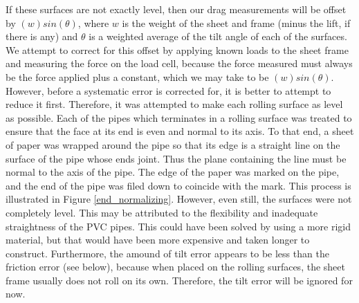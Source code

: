 \documentclass[12pt]{report} %
\begin{document}
If these surfaces are not exactly level, then our drag measurements will be offset by $(w)sin(\theta)$,
where $w$ is the weight of the sheet and frame (minus the lift, if there is any) and $\theta$ is a weighted average of the
tilt angle of each of the surfaces. We attempt to correct for this offset by applying known loads to the sheet frame and measuring
the force on the load cell, because the force measured must always be the force applied plus a constant, which we may take to be
$(w)sin(\theta)$. However, before a systematic error is corrected for, it is better to attempt to reduce it first. Therefore,
it was attempted to make each rolling surface as level as possible. Each of the pipes which terminates in a rolling surface was
treated to ensure that the face at its end is even and normal to its axis. To that end, a sheet of paper was wrapped around
the pipe so that its edge is a straight line on the surface of the pipe whose ends joint. Thus the plane containing the line must
be normal to the axis of the pipe. The edge of the paper was marked on the pipe, and the end of the pipe was filed down to coincide
with the mark. This process is illustrated in Figure \ref{end_normalizing}. However, even still, the surfaces were not completely
level. This may be attributed to the flexibility and inadequate straightness of the PVC pipes. This could have been solved by using
a more rigid material, but that would have been more expensive and taken longer to construct. Furthermore, the amound of
tilt error appears to be less than the friction error (see below), because when placed on the rolling surfaces, the sheet frame
usually does not roll on its own. Therefore, the tilt error will be ignored for now.
\end{document}
